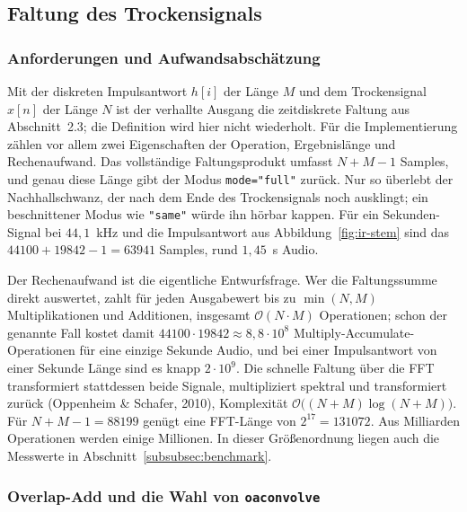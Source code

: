 \subsection{Faltung des Trockensignals}
\label{subsec:faltung}

\subsubsection{Anforderungen und Aufwandsabschätzung}
\label{subsubsec:aufwand}

Mit der diskreten Impulsantwort $h[i]$ der Länge $M$ und dem Trockensignal
$x[n]$ der Länge $N$ ist der verhallte Ausgang die zeitdiskrete Faltung aus
Abschnitt~2.3; die Definition wird hier nicht wiederholt. Für die
Implementierung zählen vor allem zwei Eigenschaften der Operation,
Ergebnislänge und Rechenaufwand. Das vollständige Faltungsprodukt umfasst
$N + M - 1$ Samples, und genau diese Länge gibt der Modus \texttt{mode="full"}
zurück. Nur so überlebt der Nachhallschwanz, der nach dem Ende des
Trockensignals noch ausklingt; ein beschnittener Modus wie \texttt{"same"}
würde ihn hörbar kappen. Für ein Sekunden-Signal bei $44{,}1$~kHz und die
Impulsantwort aus Abbildung~\ref{fig:ir-stem} sind das
$44100 + 19842 - 1 = 63941$ Samples, rund $1{,}45$~s Audio.

Der Rechenaufwand ist die eigentliche Entwurfsfrage. Wer die Faltungssumme
direkt auswertet, zahlt für jeden Ausgabewert bis zu $\min(N, M)$
Multiplikationen und Additionen, insgesamt $\mathcal{O}(N \cdot M)$
Operationen; schon der genannte Fall kostet damit
$44100 \cdot 19842 \approx 8{,}8 \cdot 10^{8}$
Multiply-Accumulate-Operationen für eine einzige Sekunde Audio, und bei einer
Impulsantwort von einer Sekunde Länge sind es knapp $2 \cdot 10^{9}$. Die
schnelle Faltung über die FFT transformiert stattdessen beide Signale,
multipliziert spektral und transformiert zurück (Oppenheim \& Schafer, 2010),
Komplexität $\mathcal{O}\bigl((N + M)\log(N + M)\bigr)$. Für
$N + M - 1 = 88199$ genügt eine FFT-Länge von $2^{17} = 131072$. Aus Milliarden
Operationen werden einige Millionen. In dieser Größenordnung liegen auch die
Messwerte in Abschnitt~\ref{subsubsec:benchmark}.

\subsubsection{Overlap-Add und die Wahl von \texttt{oaconvolve}}
\label{subsubsec:oa}

